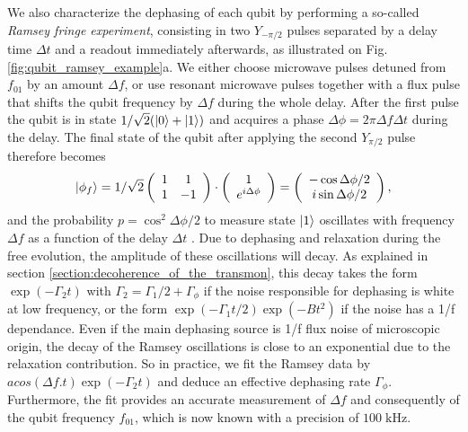 We also characterize the dephasing of each qubit by performing a so-called {\it Ramsey fringe experiment}, consisting in two $Y_{-\pi/2}$ pulses separated by a delay time ${\Delta}t$ and a readout immediately afterwards, as illustrated  on Fig. \ref{fig:qubit_ramsey_example}a. We either choose microwave pulses detuned from $f_{01}$ by an amount ${\Delta}f$, or use resonant microwave pulses together with a flux pulse that shifts the qubit frequency by ${\Delta}f$ during the whole delay. After the first pulse the qubit is in state $1/\sqrt{2}(\left| 0 \right>+\left| 1 \right>)$ and acquires  a phase  $\Delta \phi = 2\pi\Delta f \Delta t$ during the delay. The final state of the qubit after applying the second $Y_{\pi/2}$ pulse therefore becomes
%
\begin{equation}
\left| \phi_f \right> =1/\sqrt{2} \left(\begin{array}{cc} 1 & 1 \\ 1 & -1 \end{array} \right)\cdot\left(\begin{array}{c} 1 \\ e^{i\Delta\phi} \end{array}\right) = \left( \begin{array}{c}  -\cos{\Delta\phi/2} \\ i\sin{\Delta\phi/2} \end{array}\right),
\end{equation}
%
and the probability $p=\cos^2{\Delta\phi/2}$ to measure state $\left| 1 \right>$ oscillates with frequency $\Delta f$ as a function of the delay ${\Delta}t$ . Due to dephasing and relaxation during the free evolution, the amplitude of these oscillations will decay. As explained in section \ref{section:decoherence_of_the_transmon}, this decay takes the form $\exp{(-\Gamma_2 t)}$ with $\Gamma_2=\Gamma_1/2 +\Gamma_{\phi}$ if the noise responsible for dephasing is white at low frequency, or the form $\exp{(-\Gamma_1 t/2 )}\exp{(-B t^2)}$ if the noise has a 1/f dependance. Even if the main dephasing source is 1/f flux noise of microscopic origin, the decay of the Ramsey oscillations is close to an exponential due to the relaxation contribution. So in practice, we fit the Ramsey data by $a cos({\Delta}f.t)\exp{(-\Gamma_2 t)}$ and deduce an effective dephasing rate $\Gamma_{\phi}$.
Furthermore, the fit provides an accurate measurement of ${\Delta}f$ and consequently of the qubit frequency $f_{01}$, which is now known with a precision of $100\;\mathrm{kHz}$. 
